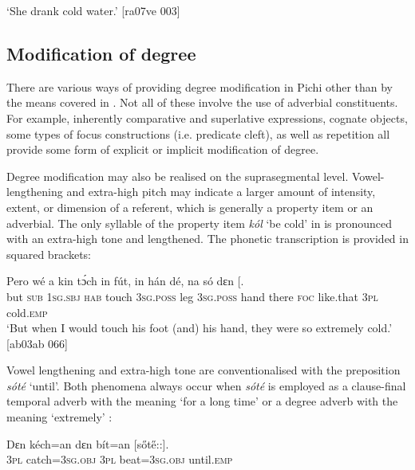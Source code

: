 \glt ‘She drank cold water.’ [ra07ve 003]
\z

\subsection{Modification of degree}\label{sec:7.7.3}

There are various ways of providing degree modification in Pichi other than by the means covered in . Not all of these involve the use of adverbial constituents. For example, inherently comparative and superlative expressions, cognate objects, some types of focus constructions (i.e. predicate cleft), as well as repetition all provide some form of explicit or implicit modification of degree.


Degree modification may also be realised on the suprasegmental level. Vowel-lengthening and extra-high pitch may indicate a larger amount of intensity, extent, or dimension of a referent, which is generally a property item or an adverbial. The only syllable of the property item \textit{kól} ‘be cold’ in  is pronounced with an extra-high tone and lengthened. The phonetic transcription is provided in squared brackets: 



\ea%
    \label{ex:key:893}
    \gll Pero    wé  a    kin  tɔ́ch    in    fút,
in    hán    dé,    na  só    dɛn    [\textstylePichiexamplenumberZchnZchn{k\H{o}::l]}.\\
but    \textsc{sub}  \textsc{1sg.sbj}  \textsc{hab}  touch  \textsc{3sg.poss}  leg
\textsc{3sg.poss}  hand  there  \textsc{foc}  like.that  \textsc{3pl}  cold.\textsc{emp}\\

\glt ‘But when I would touch his foot (and) his hand,
they were so extremely cold.’ [ab03ab 066]
\z

Vowel lengthening and extra-high tone are conventionalised with the preposition \textit{sóté} ‘until’. Both phenomena always occur when \textit{sóté} is employed as a clause-final temporal adverb with the meaning ‘for a long time’ or a degree adverb with the meaning ‘extremely’ :


\ea%
    \label{ex:key:894}
    \gll Dɛn  kéch=an    dɛn  bít=an      [s\H{o}t\H{e}::].\\
\textsc{3pl}  catch=\textsc{3sg.obj}  \textsc{3pl}  beat=\textsc{3sg.obj}  until.\textsc{emp}\\

